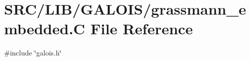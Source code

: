 \hypertarget{grassmann__embedded_8_c}{}\section{S\+R\+C/\+L\+I\+B/\+G\+A\+L\+O\+I\+S/grassmann\+\_\+embedded.C File Reference}
\label{grassmann__embedded_8_c}
{\ttfamily \#include \char`\"{}galois.\+h\char`\"{}}\newline
